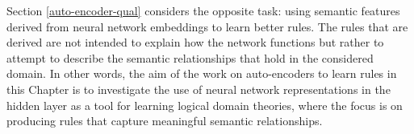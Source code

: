 Section \ref{auto-encoder-qual} considers the opposite task: using semantic features derived from neural network embeddings to learn better rules. The rules that are derived are not intended to explain how the network functions but rather to attempt to describe the semantic relationships that hold in the considered domain. In other words, the aim of the work on auto-encoders to learn rules in this Chapter is to investigate the use of neural network representations in the hidden layer as a tool for learning logical domain theories, where the focus is on producing rules that capture meaningful semantic relationships.










